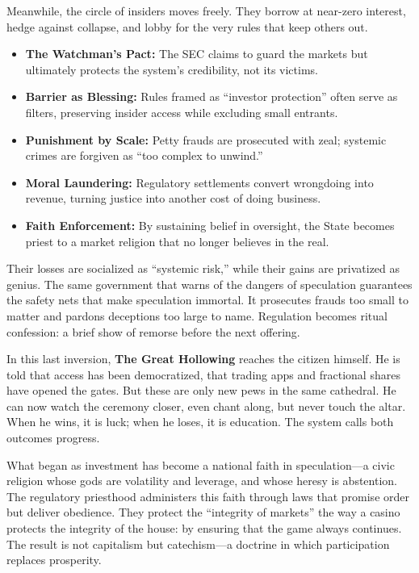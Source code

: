 \documentclass[11pt,twoside]{book}
\begin{document}
Meanwhile, the circle of insiders moves freely.  They borrow at near-zero interest, hedge against collapse, and lobby for the very rules that keep others out.  
\begin{tcolorbox}[
  title=\textbf{Regulatory Mirage},
  colback=white,
  colframe=black,
  fonttitle=\bfseries,
  top=0.5mm,
  bottom=0.5mm,
  left=3pt,
  right=3pt,
  before skip=4pt,
  after skip=6pt,
  arc=1mm,
  boxrule=0.4pt
  ]
\setlength{\itemsep}{1pt}
\setlength{\parskip}{0pt}
\begin{itemize}
  \item \textbf{The Watchman’s Pact:} The SEC claims to guard the markets but ultimately protects the system’s credibility, not its victims.  
  \item \textbf{Barrier as Blessing:} Rules framed as “investor protection” often serve as filters, preserving insider access while excluding small entrants.  
  \item \textbf{Punishment by Scale:} Petty frauds are prosecuted with zeal; systemic crimes are forgiven as “too complex to unwind.”  
  \item \textbf{Moral Laundering:} Regulatory settlements convert wrongdoing into revenue, turning justice into another cost of doing business.  
  \item \textbf{Faith Enforcement:} By sustaining belief in oversight, the State becomes priest to a market religion that no longer believes in the real.  
\end{itemize}
\end{tcolorbox}

Their losses are socialized as “systemic risk,” while their gains are privatized as genius. The same government that warns of the dangers of speculation guarantees the safety nets that make speculation immortal.  It prosecutes frauds too small to matter and pardons deceptions too large to name.  Regulation becomes ritual confession: a brief show of remorse before the next offering.

In this last inversion, \textbf{The Great Hollowing} reaches the citizen himself.  
He is told that access has been democratized, that trading apps and fractional shares have opened the gates.  
But these are only new pews in the same cathedral.  
He can now watch the ceremony closer, even chant along, but never touch the altar.  
When he wins, it is luck; when he loses, it is education.  
The system calls both outcomes progress.

What began as investment has become a national faith in speculation—a civic religion whose gods are volatility and leverage, and whose heresy is abstention.  
The regulatory priesthood administers this faith through laws that promise order but deliver obedience.  
They protect the “integrity of markets” the way a casino protects the integrity of the house: by ensuring that the game always continues.  
The result is not capitalism but catechism—a doctrine in which participation replaces prosperity.
\end{document}

